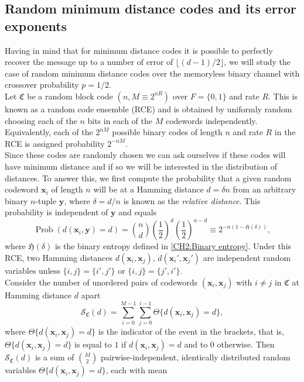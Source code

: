 \subsection{Random minimum distance codes and its error exponents}
Having in mind that for minimum distance codes it is possible to perfectly recover the message up to a number of error of $\lfloor(d-1)/2\rfloor$, we will study the case of random minimum distance codes over the memoryless binary channel with crossover probability $p=1/2$.\\
\indent Let  $\mathfrak{C}$ be a random block code $(n,M\equiv 2^{nR})$ over $F= \{0,1\}$ and rate $R$. This is known as a random code ensemble (RCE) and is obtained by uniformly random choosing each of the $n$ bits in each of the $M$ codewords independently. Equivalently, each of the $2^{nM}$ possible binary codes of length $n$ and rate $R$ in the RCE is assigned probability $2^{-nM}$.\\
\indent Since these codes are randomly chosen we can ask ourselves if these codes will have minimum distance and if so we will be interested in the distribution of distances. To answer this, we first compute the probability that a given random codeword $\mathbf{x}_i$  of length $n$ will be at a Hamming distance $d=\delta n$ from an arbitrary binary $n$-tuple $\mathbf{y}$, where $\delta=d/n$ is known as the \textit{relative distance}. This probability is independent of $\mathbf{y}$ and equals \cite{barg_random_2002}
\begin{equation}
\operatorname{Prob}(d(\mathbf{x}_i,\mathbf{y})=d) = {n \choose d}\left(\frac{1}{2} \right)^{d} \left( \frac{1}{2}\right)^{n-d} \equiv 2^{-n(1-\mathfrak{H}(\delta))},
\label{CH2:probability_of_having}
\end{equation}
where $\mathfrak{H}(\delta)$ is the binary entropy defined in \eqref{CH2:Binary entropy}. Under this RCE, two Hamming distances $d(\mathbf{x}_i,\mathbf{x}_j)$, $d(\mathbf{x}_i',\mathbf{x}_j')$ are independent random variables unless $\{i,j\} = \{i',j'\}$ or $\{i,j\}= \{j',i'\}$.\\
\indent Consider the number of unordered pairs of codewords $(\mathbf{x}_i,\mathbf{x}_j)$ with $i\neq j$ in $\mathfrak{C}$ at Hamming distance $d$ apart
\begin{equation}
\mathcal{S}_{\mathfrak{C}}(d) = \sum_{i=0}^{M-1}\sum_{j=0}^{i-1} \Theta\{d(\mathbf{x}_i,\mathbf{x}_j) = d\},
\end{equation}
where $\Theta\{d(\mathbf{x}_i,\mathbf{x}_j) = d\}$ is the indicator of the event in the brackets, that is, $\Theta\{d(\mathbf{x}_i,\mathbf{x}_j) = d\}$ is equal to $1$ if $d(\mathbf{x}_i,\mathbf{x}_j) = d$ and to $0$ otherwise. Then $\mathcal{S}_{\mathfrak{C}}(d)$ is a sum of ${M \choose 2}$ pairwise-independent, identically distributed random variables $\Theta\{d(\mathbf{x}_i,\mathbf{x}_j) = d\}$, each with mean
